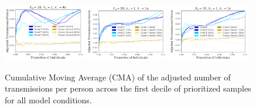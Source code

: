 \documentclass[a4paper,11pt]{article}
\begin{document}
\begin{figure}[!h]
\includegraphics[width=0.32\textwidth]{figs/results_efficacy_normalized_individual_SAMPLE-FIRSTART_STOPRATE-4x.pdf}
\includegraphics[width=0.32\textwidth]{figs/results_efficacy_normalized_individual_SAMPLE-FIRSTART_EXPDEGREE-20.pdf}
\includegraphics[width=0.32\textwidth]{figs/results_efficacy_normalized_individual_SAMPLE-FIRSTART_EXPDEGREE-30.pdf}\\
\caption{{Cumulative Moving Average (CMA) of the adjusted number of transmissions per person across the first decile of prioritized samples for all model conditions.}}\label{fig:cma-adj-trans-individual-all}
\end{figure}

\clearpage
\end{document}
